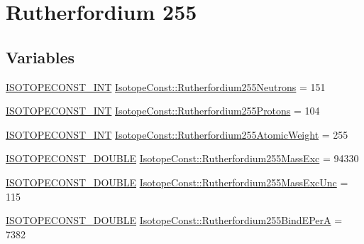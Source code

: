 \hypertarget{group___isotope_const-_rutherfordium-_rf255}{}\section{Rutherfordium 255}
\label{group___isotope_const-_rutherfordium-_rf255}
\subsection*{Variables}
\begin{DoxyCompactItemize}
\item 
\mbox{\hyperlink{group___isotope_const-_macros_ga5f18360b3e99483a35c32d789e62621c}{I\+S\+O\+T\+O\+P\+E\+C\+O\+N\+S\+T\+\_\+\+I\+NT}} \mbox{\hyperlink{group___isotope_const-_rutherfordium-_rf255_gaf875a3336960806587fb5efc48a7dfc0}{Isotope\+Const\+::\+Rutherfordium255\+Neutrons}} = 151
\item 
\mbox{\hyperlink{group___isotope_const-_macros_ga5f18360b3e99483a35c32d789e62621c}{I\+S\+O\+T\+O\+P\+E\+C\+O\+N\+S\+T\+\_\+\+I\+NT}} \mbox{\hyperlink{group___isotope_const-_rutherfordium-_rf255_ga3fbdfed55fa3b7fe59cafbbe04b5484a}{Isotope\+Const\+::\+Rutherfordium255\+Protons}} = 104
\item 
\mbox{\hyperlink{group___isotope_const-_macros_ga5f18360b3e99483a35c32d789e62621c}{I\+S\+O\+T\+O\+P\+E\+C\+O\+N\+S\+T\+\_\+\+I\+NT}} \mbox{\hyperlink{group___isotope_const-_rutherfordium-_rf255_gac2e5e9ca1f37b39a35f6423fad093a30}{Isotope\+Const\+::\+Rutherfordium255\+Atomic\+Weight}} = 255
\item 
\mbox{\hyperlink{group___isotope_const-_macros_ga8f45a7272ce02c0b4c65c44636ed719a}{I\+S\+O\+T\+O\+P\+E\+C\+O\+N\+S\+T\+\_\+\+D\+O\+U\+B\+LE}} \mbox{\hyperlink{group___isotope_const-_rutherfordium-_rf255_gaac7f13f630af3457e5c3107430aa9e1a}{Isotope\+Const\+::\+Rutherfordium255\+Mass\+Exc}} = 94330
\item 
\mbox{\hyperlink{group___isotope_const-_macros_ga8f45a7272ce02c0b4c65c44636ed719a}{I\+S\+O\+T\+O\+P\+E\+C\+O\+N\+S\+T\+\_\+\+D\+O\+U\+B\+LE}} \mbox{\hyperlink{group___isotope_const-_rutherfordium-_rf255_ga7e9a7c492af3d1c1e72ee9dc036c5980}{Isotope\+Const\+::\+Rutherfordium255\+Mass\+Exc\+Unc}} = 115
\item 
\mbox{\hyperlink{group___isotope_const-_macros_ga8f45a7272ce02c0b4c65c44636ed719a}{I\+S\+O\+T\+O\+P\+E\+C\+O\+N\+S\+T\+\_\+\+D\+O\+U\+B\+LE}} \mbox{\hyperlink{group___isotope_const-_rutherfordium-_rf255_gaa29978ad34205e345f657d64394c90cb}{Isotope\+Const\+::\+Rutherfordium255\+Bind\+E\+PerA}} = 7382

\end{DoxyCompactItemize}
